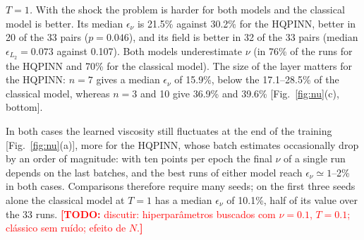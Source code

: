 \documentclass[floatfix,aps,pra,twocolumn,showpacs,superscriptaddress,10pt,nofootinbib]{revtex4-2}
\newif\ifshowtodos \showtodostrue
\newcommand{\TODO}[1]{\ifshowtodos\textcolor{red}{\textbf{[TODO:} #1\textbf{]}}\fi}
\begin{document}
\emph{$T=1$.} With the shock the problem is harder for both models and the classical model is better. Its median $\epsilon_\nu$ is 21.5\% against 30.2\% for the HQPINN, better in 20 of the 33 pairs ($p=0.046$), and its field is better in 32 of the 33 pairs (median $\epsilon_{L_2}=0.073$ against 0.107). Both models underestimate $\nu$ (in 76\% of the runs for the HQPINN and 70\% for the classical model). The size of the layer matters for the HQPINN: $n=7$ gives a median $\epsilon_\nu$ of 15.9\%, below the 17.1--28.5\% of the classical model, whereas $n=3$ and 10 give 36.9\% and 39.6\% [Fig.~\ref{fig:nu}(c), bottom].

In both cases the learned viscosity still fluctuates at the end of the training [Fig.~\ref{fig:nu}(a)], more for the HQPINN, whose batch estimates occasionally drop by an order of magnitude: with ten points per epoch the final $\nu$ of a single run depends on the last batches, and the best runs of either model reach $\epsilon_\nu\simeq1$--2\% in both cases. Comparisons therefore require many seeds; on the first three seeds alone the classical model at $T=1$ has a median $\epsilon_\nu$ of 10.1\%, half of its value over the 33 runs. \TODO{discutir: hiperpar\^ametros buscados com $\nu=0.1$, $T=0.1$; cl\'assico sem ru\'ido; efeito de $N$.}



\end{document}
